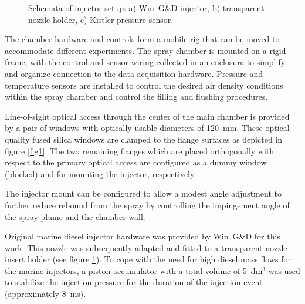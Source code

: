 \documentclass[letterpaper,twocolumn,10pt]{ilass}
\begin{document}
\begin{figure}[h]
\begin{center}
\end{center}
\vspace*{-5mm}
\caption{Schemata of injector setup:
         a) Win~G\&D injector,
				 b) transparent nozzle holder,
				 c) Kistler pressure sensor.}
\label{fig2} 
\end{figure}

The chamber hardware and controls form a mobile rig that can be moved to accommodate
different experiments.
%
The spray chamber is mounted on a rigid frame, with the control and sensor wiring collected
in an enclosure to simplify and organize connection to the data acquisition hardware.
Pressure and temperature sensors are installed to control the desired air density conditions
within the spray chamber and control the filling and flushing procedures.
%

Line-of-sight optical access through the center of the main chamber is provided by a pair
of windows with optically usable diameters of 120~mm. These optical quality fused silica windows are clamped to the flange surfaces as depicted in figure \ref{fig1}.
The two remaining flanges which are placed orthogonally with respect to the primary
optical access are configured as a dummy window (blocked) and for mounting the injector,
respectively.
%

The injector mount can be configured to allow a modest angle adjustment to further reduce
rebound from the spray by controlling the impingement angle of the spray plume and
the chamber wall.
%

Original marine diesel injector hardware was provided by Win~G\&D for this work.
This nozzle was subsequently adapted and fitted to a transparent nozzle insert holder
(see figure \ref{fig2}).
To cope with the need for high diesel mass flows for the marine injectors,
a piston accumulator with a total volume of 5~dm$^3$ was used to stabilize
the injection pressure for the duration of the injection event (approximately 8~ms). 
\end{document}
